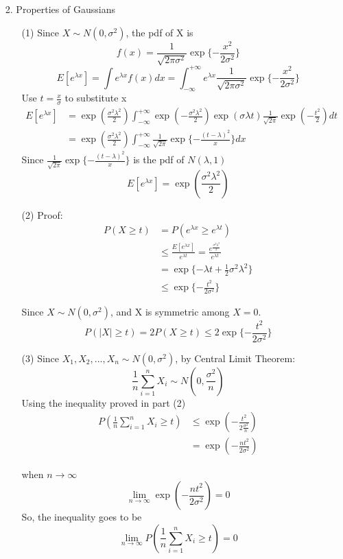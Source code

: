 \documentclass[a4paper,12pt]{article}
\begin{document}
\begin{enumerate}
\item[2.] Properties of Gaussians \\
\begin{itemize}
\item[(1)] 
Since $X \sim N(0,\sigma^2)$, the pdf of X is
$$
f(x) = \frac{1}{\sqrt{2 \pi \sigma^2}} \exp\{ -\frac{x^2}{2 \sigma^2} \}
$$
$$
E[e^{\lambda x}] = \int e^{\lambda x} f(x) dx = \int_{-\infty}^{+\infty} e^{\lambda x} \frac{1}{\sqrt{2 \pi \sigma^2}} \exp\{ -\frac{x^2}{2 \sigma^2} \}
$$
Use $t = \frac{x}{\sigma}$ to substitute x
\begin{align*}
E[e^{\lambda x}]  
&= \exp(\frac{\sigma^2 \lambda^2}{2})  \int_{-\infty}^{+\infty} \exp(-\frac{\sigma^2 \lambda^2}{2}) \exp(\sigma \lambda t) \frac{1}{\sqrt{2\pi}} \exp(-\frac{t^2}{2}) dt \\
&= \exp(\frac{\sigma^2 \lambda^2}{2}) \int_{-\infty}^{+\infty} \frac{1}{\sqrt{2\pi}} \exp \{ -\frac{(t - \lambda)^2}{x}\} dx
\end{align*}
Since $\frac{1}{\sqrt{2\pi}} \exp \{ -\frac{(t - \lambda)^2}{x}\}$ is the pdf of $N(\lambda,1)$
$$
E[e^{\lambda x}]   = \exp(\frac{\sigma^2 \lambda^2}{2})
$$

\clearpage
\item[(2)]
Proof:
\begin{align*}
P (X \ge t) &= P(e^{\lambda x} \ge e^{\lambda t}) \\
		    &\le \frac{E[e^{\lambda x}]}{e^{\lambda t}} = \frac{e^{\frac{\sigma^2 \lambda^2}{2}}}{e^{\lambda t}} \\
		    &= \exp \{ -\lambda t + \frac{1}{2} \sigma^2 \lambda^2 \} \\
		    &\le \exp \{ -\frac{t^2}{2 \sigma^2}\}
\end{align*}

Since $X \sim N(0,\sigma^2)$, and X is symmetric among $X=0$.
$$
P (|X| \ge t) = 2 P (X \ge t) \le 2 \exp \{ -\frac{t^2}{2 \sigma^2}\}
$$

\clearpage
\item[(3)]
Since $X_1,X_2,...,X_n \sim N (0,\sigma^2)$, by Central Limit Theorem:
$$
\frac{1}{n} \sum_{i=1}^n X_i \sim N(0,\frac{\sigma^2}{n})
$$
Using the inequality proved in part (2)
\begin{align*}
P (\frac{1}{n} \sum_{i=1}^n X_i \ge t) &\le \exp (-\frac{t^2}{2 \frac{\sigma^2}{n}}) \\
							            &= \exp (-\frac{n t^2}{2 \sigma^2})
\end{align*}

when $n \to \infty$
$$
\lim_{n \to \infty} \exp (-\frac{n t^2}{2 \sigma^2}) = 0
$$
So, the inequality goes to be
$$
\lim_{n \to \infty} P (\frac{1}{n} \sum_{i=1}^n X_i \ge t) = 0
$$


\end{itemize}
\end{enumerate}
\end{document}
